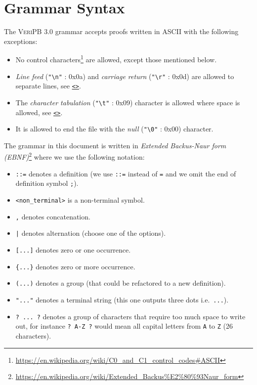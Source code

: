 \documentclass[a4paper]{article}
\newcommand{\lnkBNF}[1]{\hyperlink{def:#1}{<\detokenize{#1}>}}
\newcommand{\veriPB}[0]{\textsc{VeriPB}}
\begin{document}
\section{Grammar Syntax}\label{sec:syntax}
The \veriPB{} 3.0 grammar accepts proofs written in ASCII with the following exceptions:
\begin{itemize}
	\item No control characters\footnote{\url{https://en.wikipedia.org/wiki/C0_and_C1_control_codes\#ASCII}} are allowed, except those mentioned below.
	\item \emph{Line feed} (\lstinline!"\n"! : 0x0a) and \emph{carriage return} (\lstinline!"\r"! : 0x0d) are allowed to separate lines, see \texttt{\lnkBNF{eol}}.
	\item The \emph{character tabulation} (\lstinline!"\t"! : 0x09) character is allowed where space is allowed, see \texttt{\lnkBNF{space}}.
	\item It is allowed to end the file with the \emph{null} (\lstinline!"\0"! : 0x00) character.
\end{itemize}

The grammar in this document is written in \emph{Extended Backus-Naur form (EBNF)}\footnote{\url{https://en.wikipedia.org/wiki/Extended_Backus\%E2\%80\%93Naur_form}} where we use the following notation:
\begin{itemize}
	\item \lstinline!::=! denotes a definition (we use \lstinline!::=! instead of \lstinline!=! and we omit the end of definition symbol \verb!;!).
	\item \lstinline!<non_terminal>! is a non-terminal symbol.
	\item \lstinline!,! denotes concatenation.
	\item \lstinline!|! denotes alternation (choose one of the options).
	\item \lstinline![...]! denotes zero or one occurrence.
	\item \lstinline!{...}! denotes zero or more occurrence.
	\item \lstinline!(...)! denotes a group (that could be refactored to a new definition).
	\item \lstinline!"..."! denotes a terminal string (this one outputs three dots i.e.\ \verb!...!).
	\item \lstinline!? ... ?! denotes a group of characters that require too much space to write out, for instance \lstinline!? A-Z ?! would mean all capital letters from \verb!A! to \verb!Z! (26 characters).
\end{itemize}
\end{document}
